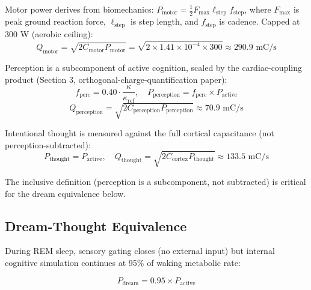 \begin{definition}
Motor power derives from biomechanics: $P_{\text{motor}} = \frac{1}{2} F_{\max} \ell_{\text{step}} f_{\text{step}}$, where $F_{\max}$ is peak ground reaction force, $\ell_{\text{step}}$ is step length, and $f_{\text{step}}$ is cadence. Capped at 300 W (aerobic ceiling):
\begin{equation}
Q_{\text{motor}} = \sqrt{2 C_{\text{motor}} P_{\text{motor}}} = \sqrt{2 \times 1.41 \times 10^{-4} \times 300} \approx 290.9 \text{ mC/s}
\end{equation}
\end{definition}

\begin{definition}
Perception is a subcomponent of active cognition, scaled by the cardiac-coupling product (Section 3, orthogonal-charge-quantification paper):
\begin{equation}
f_{\text{perc}} = 0.40 \cdot \frac{\kappa}{\kappa_{\text{ref}}}, \quad P_{\text{perception}} = f_{\text{perc}} \times P_{\text{active}}
\end{equation}
\begin{equation}
Q_{\text{perception}} = \sqrt{2 C_{\text{perception}} P_{\text{perception}}} \approx 70.9 \text{ mC/s}
\end{equation}
\end{definition}

\begin{definition}
Intentional thought is measured against the full cortical capacitance (not perception-subtracted):
\begin{equation}
P_{\text{thought}} = P_{\text{active}}, \quad Q_{\text{thought}} = \sqrt{2 C_{\text{cortex}} P_{\text{thought}}} \approx 133.5 \text{ mC/s}
\end{equation}

The inclusive definition (perception is a subcomponent, not subtracted) is critical for the dream equivalence below.
\end{definition}

\subsection{Dream-Thought Equivalence}

During REM sleep, sensory gating closes (no external input) but internal cognitive simulation continues at 95\% of waking metabolic rate:

\begin{equation}
P_{\text{dream}} = 0.95 \times P_{\text{active}}
\end{equation}

